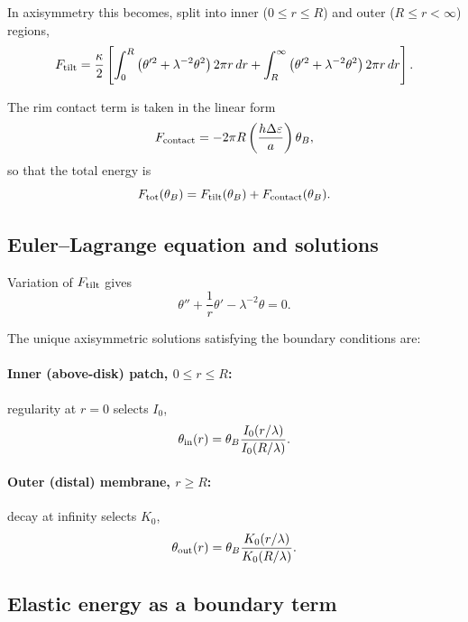 \documentclass[11pt]{article}
\begin{document}
In axisymmetry this becomes, split into inner ($0\le r\le R$) and outer ($R\le r<\infty$) regions,
\begin{equation}
F_{\rm tilt}
=
\frac{\kappa}{2}\left[
\int_{0}^{R}\left(\theta'^2+\lambda^{-2}\theta^2\right)2\pi r\,dr
+
\int_{R}^{\infty}\left(\theta'^2+\lambda^{-2}\theta^2\right)2\pi r\,dr
\right].
\end{equation}

The rim contact term is taken in the linear form
\begin{equation}
F_{\rm contact}
=
-2\pi R\left(\frac{h\Delta\varepsilon}{a}\right)\theta_B,
\end{equation}
so that the total energy is
\begin{equation}
F_{\rm tot}(\theta_B)=F_{\rm tilt}(\theta_B)+F_{\rm contact}(\theta_B).
\end{equation}

\subsection{Euler--Lagrange equation and solutions}

Variation of $F_{\rm tilt}$ gives
\begin{equation}
\theta''+\frac{1}{r}\theta' - \lambda^{-2}\theta = 0.
\end{equation}

The unique axisymmetric solutions satisfying the boundary conditions are:

\paragraph{Inner (above-disk) patch, $0\le r\le R$:}
regularity at $r=0$ selects $I_0$,
\begin{equation}
\theta_{\rm in}(r)=\theta_B\frac{I_0(r/\lambda)}{I_0(R/\lambda)}.
\end{equation}

\paragraph{Outer (distal) membrane, $r\ge R$:}
decay at infinity selects $K_0$,
\begin{equation}
\theta_{\rm out}(r)
=
\theta_B\frac{K_0(r/\lambda)}{K_0(R/\lambda)}.
\end{equation}

\subsection{Elastic energy as a boundary term}
\end{document}
